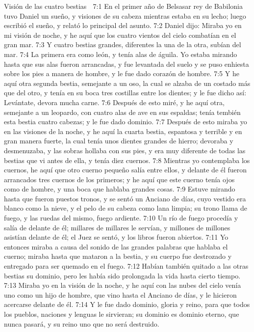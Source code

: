 Visión de las cuatro bestias  

7:1 En el primer año de Belsasar rey de Babilonia tuvo Daniel un sueño, y visiones de su cabeza mientras estaba en su lecho; luego escribió el sueño, y relató lo principal del asunto.  
7:2 Daniel dijo: Miraba yo en mi visión de noche, y he aquí que los cuatro vientos del cielo combatían en el gran mar.  
7:3 Y cuatro bestias grandes, diferentes la una de la otra, subían del mar. 
7:4 La primera era como león, y tenía alas de águila. Yo estaba mirando hasta que sus alas fueron arrancadas, y fue levantada del suelo y se puso enhiesta sobre los pies a manera de hombre, y le fue dado corazón de hombre.  
7:5 Y he aquí otra segunda bestia, semejante a un oso, la cual se alzaba de un costado más que del otro, y tenía en su boca tres costillas entre los dientes; y le fue dicho así: Levántate, devora mucha carne.  
7:6 Después de esto miré, y he aquí otra, semejante a un leopardo, con cuatro alas de ave en sus espaldas; tenía tembién esta bestia cuatro cabezas; y le fue dado dominio. 
7:7 Después de esto miraba yo en las visiones de la noche, y he aquí la cuarta bestia, espantosa y terrible y en gran manera fuerte, la cual tenía unos dientes grandes de hierro; devoraba y desmenuzaba, y las sobras hollaba con sus pies, y era muy diferente de todas las bestias que vi antes de ella, y tenía diez cuernos. 
7:8 Mientras yo contemplaba los cuernos, he aquí que otro cuerno pequeño salía entre ellos, y delante de él fueron arrancados tres cuernos de los primeros; y he aquí que este cuerno tenía ojos como de hombre, y una boca que hablaba grandes cosas. 
7:9 Estuve mirando hasta que fueron puestos tronos,  y se sentó un Anciano de días, cuyo vestido era blanco como la nieve, y el pelo de su cabeza como lana limpia; su trono llama de fuego, y las ruedas del mismo, fuego ardiente.  
7:10 Un río de fuego procedía y salía de delante de él; millares de millares le servían, y millones de millones asistían delante de él;  el Juez se sentó, y los libros fueron abiertos. 
7:11 Yo entonces miraba a causa del sonido de las grandes palabras que hablaba el cuerno; miraba hasta que mataron a la bestia, y su cuerpo fue destrozado y entregado para ser quemado en el fuego.  
7:12 Habían también quitado a las otras bestias su dominio, pero les había sido prolongada la vida hasta cierto tiempo.  
7:13 Miraba yo en la visión de la noche, y he aquí con las nubes del cielo venía uno como un hijo de hombre, que vino hasta el Anciano de días, y le hicieron acercarse delante de él.  
7:14 Y le fue dado dominio, gloria y reino, para que todos los pueblos, naciones y lenguas le sirvieran;  su dominio es dominio eterno, que nunca pasará, y su reino uno que no será destruido.  
